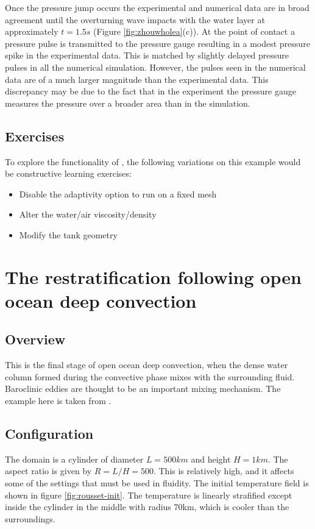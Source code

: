 Once the pressure jump occurs the experimental and numerical data are in broad agreement until the overturning wave impacts with the water layer at approximately $t=1.5s$ (Figure \ref{fig:zhouwholea}(c)).  At the point of contact a pressure pulse is transmitted to the pressure gauge resulting in a modest pressure spike in the experimental data.  This is matched by slightly delayed pressure pulses in all the numerical simulation.  However, the pulses seen in the numerical data are of a much larger magnitude than the experimental data. This discrepancy may be due to the fact that in the experiment the pressure gauge measures the pressure over a broader area than in the simulation. 

\subsection{Exercises}
To explore the functionality of \fluidity, the following variations on this example would be constructive learning exercises:

\begin{itemize}
\item Disable the adaptivity option to run on a fixed mesh
\item Alter the water/air viscosity/density
\item Modify the tank geometry
\end{itemize}

\section{The restratification following open ocean deep convection}

\subsection{Overview}

This is the final stage of open ocean deep convection, when the dense water column formed during the convective phase mixes with the surrounding fluid.  Baroclinic eddies are thought to be an important mixing mechanism. The example here is taken from \cite{rousset09}. 

\subsection{Configuration}

The domain is a cylinder of diameter $L=500\unit{km}$ and height $H=1\unit{km}$. The aspect ratio is given by $R=L/H=500$. This is relatively high, and it affects some of the settings that must be used in fluidity.  The initial temperature field is shown in figure \ref{fig:rousset-init}. The temperature is linearly strafified except inside the cylinder in the middle with radius 70km, which is cooler than the surroundings. 

